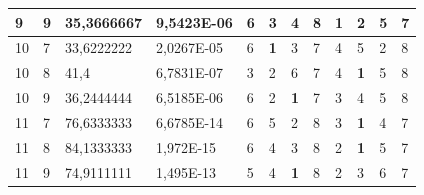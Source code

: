 \documentclass[conference]{IEEEtran}
\begin{document}
\begin{table}[]
\begin{tabular}{|llll|llllllll|}
		\multicolumn{1}{|l|}{9}   & \multicolumn{1}{l|}{9}         & \multicolumn{1}{l|}{35,3666667}    & 9,5423E-06 & \multicolumn{1}{l|}{6}   & \multicolumn{1}{l|}{3}          & \multicolumn{1}{l|}{4}          & \multicolumn{1}{l|}{8}   & \multicolumn{1}{l|}{\textbf{1}} & \multicolumn{1}{l|}{2}          & \multicolumn{1}{l|}{5}          & 7                      \\ \hline
		\multicolumn{1}{|l|}{10}  & \multicolumn{1}{l|}{7}         & \multicolumn{1}{l|}{33,6222222}    & 2,0267E-05 & \multicolumn{1}{l|}{6}   & \multicolumn{1}{l|}{\textbf{1}} & \multicolumn{1}{l|}{3}          & \multicolumn{1}{l|}{7}   & \multicolumn{1}{l|}{4}          & \multicolumn{1}{l|}{5}          & \multicolumn{1}{l|}{2}          & 8                      \\ \hline
		\multicolumn{1}{|l|}{10}  & \multicolumn{1}{l|}{8}         & \multicolumn{1}{l|}{41,4}          & 6,7831E-07 & \multicolumn{1}{l|}{3}   & \multicolumn{1}{l|}{2}          & \multicolumn{1}{l|}{6}          & \multicolumn{1}{l|}{7}   & \multicolumn{1}{l|}{4}          & \multicolumn{1}{l|}{\textbf{1}} & \multicolumn{1}{l|}{5}          & 8                      \\ \hline
		\multicolumn{1}{|l|}{10}  & \multicolumn{1}{l|}{9}         & \multicolumn{1}{l|}{36,2444444}    & 6,5185E-06 & \multicolumn{1}{l|}{6}   & \multicolumn{1}{l|}{2}          & \multicolumn{1}{l|}{\textbf{1}} & \multicolumn{1}{l|}{7}   & \multicolumn{1}{l|}{3}          & \multicolumn{1}{l|}{4}          & \multicolumn{1}{l|}{5}          & 8                      \\ \hline
		\multicolumn{1}{|l|}{11}  & \multicolumn{1}{l|}{7}         & \multicolumn{1}{l|}{76,6333333}    & 6,6785E-14 & \multicolumn{1}{l|}{6}   & \multicolumn{1}{l|}{5}          & \multicolumn{1}{l|}{2}          & \multicolumn{1}{l|}{8}   & \multicolumn{1}{l|}{3}          & \multicolumn{1}{l|}{\textbf{1}} & \multicolumn{1}{l|}{4}          & 7                      \\ \hline
		\multicolumn{1}{|l|}{11}  & \multicolumn{1}{l|}{8}         & \multicolumn{1}{l|}{84,1333333}    & 1,972E-15  & \multicolumn{1}{l|}{6}   & \multicolumn{1}{l|}{4}          & \multicolumn{1}{l|}{3}          & \multicolumn{1}{l|}{8}   & \multicolumn{1}{l|}{2}          & \multicolumn{1}{l|}{\textbf{1}} & \multicolumn{1}{l|}{5}          & 7                      \\ \hline
		\multicolumn{1}{|l|}{11}  & \multicolumn{1}{l|}{9}         & \multicolumn{1}{l|}{74,9111111}    & 1,495E-13  & \multicolumn{1}{l|}{5}   & \multicolumn{1}{l|}{4}          & \multicolumn{1}{l|}{\textbf{1}} & \multicolumn{1}{l|}{8}   & \multicolumn{1}{l|}{2}          & \multicolumn{1}{l|}{3}          & \multicolumn{1}{l|}{6}          & 7                      \\ \hline

\end{tabular}
\end{table}
\end{document}
